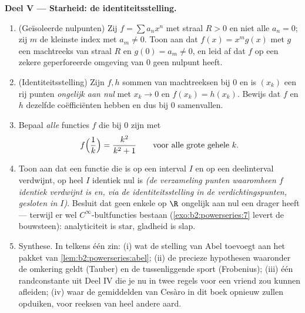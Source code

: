 \begin{problem}
\medskip
\noindent\textbf{Deel V --- Starheid: de identiteitsstelling.}
\begin{enumerate}[resume]
  \item (Geïsoleerde nulpunten) Zij $f = \sum a_nx^n$ met straal $R
        > 0$ en niet alle $a_n = 0$; zij $m$ de kleinste index met
        $a_m \neq 0$. Toon aan dat $f(x) = x^m g(x)$ met $g$ een
        machtreeks van straal $R$ en $g(0) = a_m \neq 0$, en leid
        af dat $f$ op een zekere geperforeerde omgeving van $0$
        geen nulpunt heeft.
  \item (Identiteitsstelling) Zijn $f, h$ sommen van machtreeksen
        bij $0$ en is $(x_k)$ een rij punten \emph{ongelijk aan
        nul} met $x_k \to 0$ en $f(x_k) = h(x_k)$. Bewijs dat $f$
        en $h$ dezelfde coëfficiënten hebben en dus bij $0$
        samenvallen.
  \item Bepaal \emph{alle} functies $f$ die bij $0$  zijn
        met
        \[
        f\Bigl(\frac1k\Bigr) = \frac{k^2}{k^2+1}
        \qquad\text{voor alle grote gehele } k .
        \]
  \item Toon aan dat een functie die  is op een 
        interval $I$ en op een deelinterval verdwijnt, op heel $I$
        identiek nul is \emph{(de verzameling punten waaromheen
        $f$ identiek verdwijnt is  en, via de
        identiteitsstelling in de verdichtingspunten, gesloten in
        $I$)}. Besluit dat geen enkele  op $\R$
        ongelijk aan nul een  drager heeft --- terwijl er
        wel $C^\infty$-bultfuncties bestaan
        (\cref{exo:b2:powerseries:7} levert de bouwsteen):
        analyticiteit is star, gladheid is slap.
  \item Synthese. In telkens één zin: (i) wat de stelling van Abel
        toevoegt aan het pakket  van
        \cref{lem:b2:powerseries:abel}; (ii) de precieze hypothesen
        waaronder de omkering geldt (Tauber) en de tussenliggende
        sport (Frobenius); (iii) één randconstante uit Deel IV die
        je nu in twee regels voor een vriend zou kunnen afleiden;
        (iv) waar de gemiddelden van Cesàro in dit boek opnieuw
        zullen opduiken, voor reeksen van heel andere aard.
\end{enumerate}
\end{problem}
